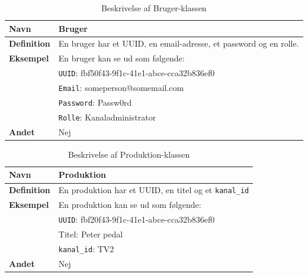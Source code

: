 \begin{table}[ht]
    \begin{tabularx}{\textwidth}{|p{3cm}|X|}
        \hline
        \textbf{Navn} & Bruger\\
        \hline
        \textbf{Definition} &  En bruger har et UUID, en email-adresse, et password og en rolle. \\
        \hline
        \textbf{Eksempel} & En bruger kan se ud som følgende: \\
                          & \texttt{UUID}: fbf50f43-9f1c-41e1-abce-cca32b836ef0 \\
                          & \texttt{Email}: someperson@somemail.com\\
                          & \texttt{Password}: Passw0rd\\
                          & \texttt{Rolle}: Kanaladministrator \\
        \hline
        \textbf{Andet} & Nej\\
        \hline
    \end{tabularx}
    \caption{Beskrivelse af Bruger-klassen}
    \label{tab:user_class_description}
\end{table}

\begin{table}[ht]
    \begin{tabularx}{\textwidth}{|p{3cm}|X|}
        \hline
        \textbf{Navn} & Produktion\\
        \hline
        \textbf{Definition} &  En produktion har et UUID, en titel og et \texttt{kanal\_id}\\
        \hline
        \textbf{Eksempel} & En produktion kan se ud som følgende:\\
                          & \texttt{UUID}: fbf20f43-9f1c-41e1-abce-cca32b836ef0 \\
                          & Titel: Peter pedal \\
                          & \texttt{kanal\_id}: TV2 \\
        \hline
        \textbf{Andet} & Nej\\
        \hline
    \end{tabularx}
    \caption{Beskrivelse af Produktion-klassen}
    \label{tab:production_class_description}
\end{table}

